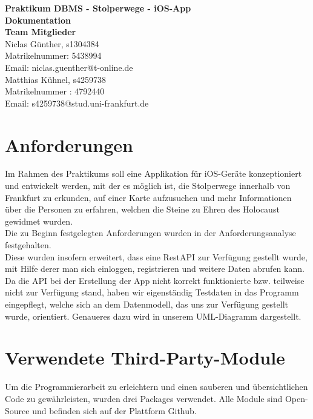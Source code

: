 \documentclass[a4paper, 11pt]{report}
\begin{document}
	\noindent
	\thispagestyle{empty}
	\Large\textbf{Praktikum DBMS - Stolperwege - iOS-App}\\
	\large\textbf{Dokumentation} \\ \newline
	\large \textbf{Team Mitglieder} \\ \newline
	Niclas G\"unther, s1304384\\
	Matrikelnummer: 5438994\\
	Email: niclas.guenther@t-online.de \\ \newline
	Matthias Kühnel, s4259738\\
	Matrikelnummer : 4792440 \\
	Email: s4259738@stud.uni-frankfurt.de \\
	\newpage
	
	\section*{Anforderungen}
	
	Im Rahmen des Praktikums soll eine Applikation für iOS-Geräte konzeptioniert und entwickelt werden, mit der es möglich ist, die Stolperwege innerhalb von Frankfurt zu erkunden, auf einer Karte aufzusuchen und mehr Informationen über die Personen zu erfahren, welchen die Steine zu Ehren des Holocaust gewidmet wurden.\\
	Die zu Beginn festgelegten Anforderungen wurden in der Anforderungsanalyse festgehalten.\\
	Diese wurden insofern erweitert, dass eine RestAPI zur Verfügung gestellt wurde, mit Hilfe derer man sich einloggen, registrieren und weitere Daten abrufen kann. Da die API bei der Erstellung der App nicht korrekt funktionierte bzw. teilweise nicht zur Verfügung stand, haben wir eigenständig Testdaten in das Programm eingepflegt, welche sich an dem Datenmodell, das uns zur Verfügung gestellt wurde, orientiert. Genaueres dazu wird in unserem UML-Diagramm dargestellt.\\
	
	\section*{Verwendete Third-Party-Module}
	
	Um die Programmierarbeit zu erleichtern und einen sauberen und übersichtlichen Code zu gewährleisten, wurden drei Packages verwendet.
	Alle Module sind Open-Source und befinden sich auf der Plattform Github.
	
\end{document}
